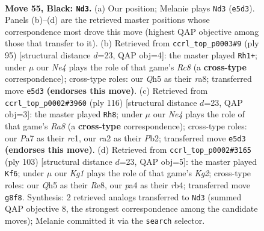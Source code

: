 \documentclass[11pt]{article}
\begin{document}
\clearpage

\begin{figure}[p]\centering
\begin{subfigure}{0.46\textwidth}\centering
\resizebox{\linewidth}{!}{%
\newchessgame
\chessboard[
  setfen={6k1/p7/1p6/4np1q/P1p5/6P1/RP4K1/8 b - - 1 55},
  showmover=false,
  pgfstyle=straightmove, color=movearrow, markmove={e5-d3}
]}
\caption{}
\end{subfigure}\hfill
\begin{subfigure}{0.46\textwidth}\centering
\resizebox{\linewidth}{!}{%
\newchessgame
\chessboard[
  setfen={R7/8/6pk/P1p2p2/5P2/6PK/8/2r5 b - - 0 48},
  showmover=false,
  pgfstyle=straightmove, color=movearrow, markmove={c1-h1}
]}
\caption{}
\end{subfigure}
\\[4pt]
\begin{subfigure}{0.46\textwidth}\centering
\resizebox{\linewidth}{!}{%
\newchessgame
\chessboard[
  setfen={R7/1pk5/2p5/6pp/4P3/P2K2P1/1P6/2r5 w - - 0 59},
  showmover=false,
  pgfstyle=straightmove, color=movearrow, markmove={a8-h8}
]}
\caption{}
\end{subfigure}\hfill
\begin{subfigure}{0.46\textwidth}\centering
\resizebox{\linewidth}{!}{%
\newchessgame
\chessboard[
  setfen={4r3/6k1/7p/5pp1/1R1P4/3K3P/6P1/8 b - - 3 52},
  showmover=false,
  pgfstyle=straightmove, color=movearrow, markmove={g7-f6}
]}
\caption{}
\end{subfigure}
\caption{\textbf{Move 55, Black: \texttt{Nd3}.} (a) Our position; Melanie plays \texttt{Nd3} (\texttt{e5d3}). Panels (b)--(d) are the retrieved master positions whose correspondence most drove this move (highest QAP objective among those that transfer to it). (b) Retrieved from \texttt{ccrl\_top\_p0003\#9} (ply 95) [structural distance $d$=23, QAP obj=4]: the master played \texttt{Rh1+}; under $\mu$ our \emph{Ne4} plays the role of that game's \emph{Rc8} (a \textbf{cross-type} correspondence); cross-type roles: our \emph{Q}h5 as their \emph{r}a8; transferred move \texttt{e5d3} \textbf{(endorses this move)}. (c) Retrieved from \texttt{ccrl\_top\_p0002\#3960} (ply 116) [structural distance $d$=23, QAP obj=3]: the master played \texttt{Rh8}; under $\mu$ our \emph{Ne4} plays the role of that game's \emph{Ra8} (a \textbf{cross-type} correspondence); cross-type roles: our \emph{P}a7 as their \emph{r}c1, our \emph{r}a2 as their \emph{P}b2; transferred move \texttt{e5d3} \textbf{(endorses this move)}. (d) Retrieved from \texttt{ccrl\_top\_p0002\#3165} (ply 103) [structural distance $d$=23, QAP obj=5]: the master played \texttt{Kf6}; under $\mu$ our \emph{Kg1} plays the role of that game's \emph{Kg2}; cross-type roles: our \emph{Q}h5 as their \emph{R}e8, our \emph{p}a4 as their \emph{r}b4; transferred move \texttt{g8f8}. Synthesis: 2 retrieved analogs transferred to \texttt{Nd3} (summed QAP objective 8, the strongest correspondence among the candidate moves); Melanie committed it via the \texttt{search} selector.}
\label{fig:thought-m109}
\end{figure}
\end{document}
